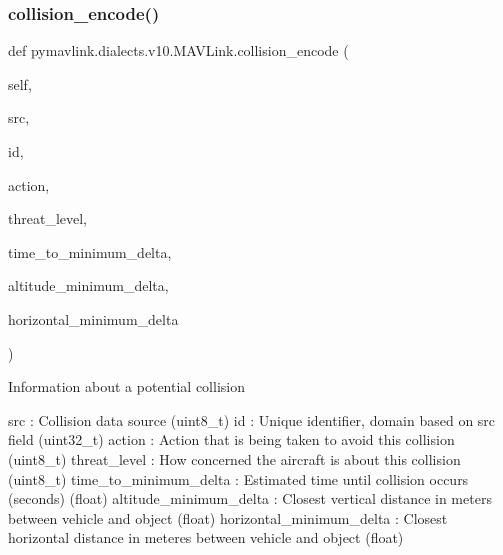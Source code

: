 \begin{DoxyVerb}
\begin{DoxyVerb}
\subsubsection{\texorpdfstring{collision\+\_\+encode()}{collision\_encode()}}
{\footnotesize\ttfamily def pymavlink.\+dialects.\+v10.\+M\+A\+V\+Link.\+collision\+\_\+encode (\begin{DoxyParamCaption}\item[{}]{self,  }\item[{}]{src,  }\item[{}]{id,  }\item[{}]{action,  }\item[{}]{threat\+\_\+level,  }\item[{}]{time\+\_\+to\+\_\+minimum\+\_\+delta,  }\item[{}]{altitude\+\_\+minimum\+\_\+delta,  }\item[{}]{horizontal\+\_\+minimum\+\_\+delta }\end{DoxyParamCaption})}

\begin{DoxyVerb}Information about a potential collision

src                       : Collision data source (uint8_t)
id                        : Unique identifier, domain based on src field (uint32_t)
action                    : Action that is being taken to avoid this collision (uint8_t)
threat_level              : How concerned the aircraft is about this collision (uint8_t)
time_to_minimum_delta        : Estimated time until collision occurs (seconds) (float)
altitude_minimum_delta        : Closest vertical distance in meters between vehicle and object (float)
horizontal_minimum_delta        : Closest horizontal distance in meteres between vehicle and object (float)\end{DoxyVerb}
 \mbox{\label{classpymavlink_1_1dialects_1_1v10_1_1MAVLink_ac8e6be8cd69b0e258e58479ee58ec6eb}} 

\end{DoxyVerb}
\end{DoxyVerb}
